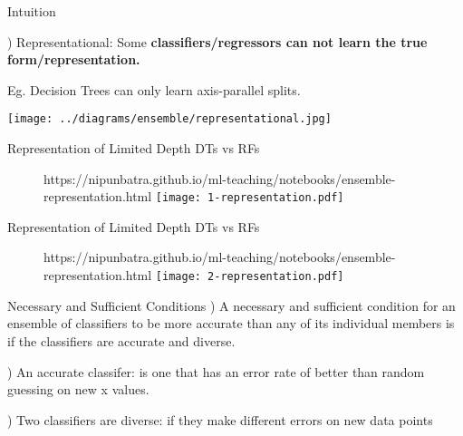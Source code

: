 \documentclass{beamer}
\begin{document}
\begin{frame}{Intuition}

  ) Representational: Some \textbf{classifiers/regressors can not learn the true form/representation.}

  \pause Eg. Decision Trees can only learn axis-parallel splits.

  \texttt{[image: ../diagrams/ensemble/representational.jpg]}


\end{frame}

\begin{frame}{Representation of Limited Depth DTs vs RFs}

\begin{figure}[htp]
  \centering
  \begin{notebookbox}{https://nipunbatra.github.io/ml-teaching/notebooks/ensemble-representation.html}
    \texttt{[image: 1-representation.pdf]}
  \end{notebookbox}
\end{figure}

\end{frame}
\begin{frame}{Representation of Limited Depth DTs vs RFs}

  \begin{figure}[htp]
    \centering
    \begin{notebookbox}{https://nipunbatra.github.io/ml-teaching/notebooks/ensemble-representation.html}
      \texttt{[image: 2-representation.pdf]}
    \end{notebookbox}
  \end{figure}
  
  \end{frame}




\begin{frame}{Necessary and Sufficient Conditions}
  ) A necessary and sufficient condition for an ensemble of classifiers to be more
  accurate than any of its individual members is if the classifiers are accurate and
  diverse.

  ) An accurate classifer: \pause  is one that has an
  error rate of better than random guessing on new x values.

  ) Two classifiers are diverse: \pause  if they make different errors on new data points

\end{frame}
\end{document}
